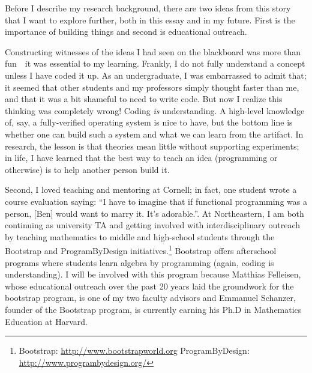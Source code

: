 \documentclass[12pt]{article}
\begin{document}

Before I describe my research background, there are two ideas from this story that I want to explore further, both in this essay and in my future.
First is the importance of building things and second is educational outreach.

Constructing witnesses of the ideas I had seen on the blackboard was more than fun~\textemdash~it was essential to my learning.
Frankly, I do not fully understand a concept unless I have coded it up.
As an undergraduate, I was embarrassed to admit that; it seemed that other students and my professors simply thought faster than me, and that it was a bit shameful to need to write code.
But now I realize this thinking was completely wrong!
Coding \emph{is} understanding.
A high-level knowledge of, say, a fully-verified operating system is nice to have, but the bottom line is whether one can build such a system and what we can learn from the artifact.
In research, the lesson is that theories mean little without supporting experiments; in life, I have learned that the best way to teach an idea (programming or otherwise) is to help another person build it.

Second, I loved teaching and mentoring at Cornell; in fact, one student wrote a course evaluation saying: ``I have to imagine that if functional programming was a person, [Ben] would want to marry it. It's adorable.''.
At Northeastern, I am both continuing as university TA and getting involved with interdisciplinary outreach by teaching mathematics to middle and high-school students through the Bootstrap and ProgramByDesign initiatives.\footnote{Bootstrap: \url{http://www.bootstrapworld.org} \qquad ProgramByDesign: \url{http://www.programbydesign.org/}}
Bootstrap offers afterschool programs where students learn algebra by programming (again, coding is understanding).
I will be involved with this program because Matthias Felleisen, whose educational outreach over the past 20 years laid the groundwork for the bootstrap program, is one of my two faculty advisors and Emmanuel Schanzer, founder of the Bootstrap program, is currently earning his Ph.D in Mathematics Education at Harvard.
\end{document}
